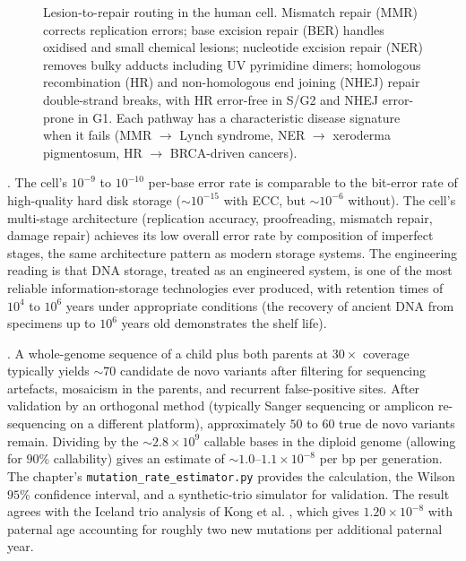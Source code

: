 \begin{figure}[h]
\centering

\caption{Lesion-to-repair routing in the human cell. Mismatch repair
(MMR) corrects replication errors; base excision repair (BER) handles
oxidised and small chemical lesions; nucleotide excision repair (NER)
removes bulky adducts including UV pyrimidine dimers; homologous
recombination (HR) and non-homologous end joining (NHEJ) repair
double-strand breaks, with HR error-free in S/G2 and NHEJ
error-prone in G1. Each pathway has a characteristic disease
signature when it fails (MMR $\to$ Lynch syndrome, NER $\to$
xeroderma pigmentosum, HR $\to$ BRCA-driven cancers).}
\label{fig:repair-pathways}
\end{figure}

. The cell's
$10^{-9}$ to $10^{-10}$ per-base error rate is comparable to the
bit-error rate of high-quality hard disk storage
($\sim 10^{-15}$ with ECC, but $\sim 10^{-6}$ without). The cell's
multi-stage architecture (replication accuracy, proofreading,
mismatch repair, damage repair) achieves its low overall error rate
by composition of imperfect stages, the same architecture pattern as
modern storage systems. The engineering reading is that DNA storage,
treated as an engineered system, is one of the most reliable
information-storage technologies ever produced, with retention times
of $10^4$ to $10^6$ years under appropriate conditions (the recovery
of ancient DNA from specimens up to $10^6$ years old demonstrates the
shelf life).

. A whole-genome sequence of a child plus both parents at
$30 \times$ coverage typically yields $\sim 70$ candidate de novo
variants after filtering for sequencing artefacts, mosaicism in the
parents, and recurrent false-positive sites. After validation by an
orthogonal method (typically Sanger sequencing or amplicon
re-sequencing on a different platform), approximately $50$ to $60$
true de novo variants remain. Dividing by the $\sim 2.8 \times 10^9$
callable bases in the diploid genome (allowing for $90\%$ callability)
gives an estimate of
$\sim 1.0\text{--}1.1 \times 10^{-8}$ per bp per generation. The
chapter's \texttt{mutation\_rate\_estimator.py} provides the
calculation, the Wilson $95\%$ confidence interval, and a
synthetic-trio simulator for validation. The result agrees with the
Iceland trio analysis of Kong et al. \cite{paper:v6c03-kong-2012},
which gives $1.20 \times 10^{-8}$ with paternal age accounting for
roughly two new mutations per additional paternal year.

